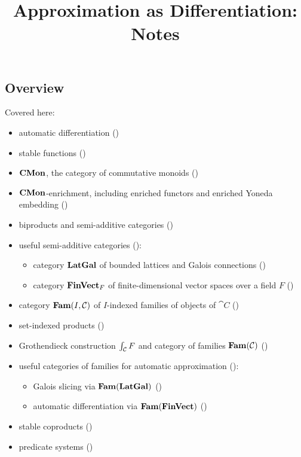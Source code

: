 \documentclass[acmsmall,screen]{acmart}
\begin{document}
\title{Approximation as Differentiation: Notes}

\maketitle

\subsection{Overview}

Covered here:
\begin{itemize}
\item automatic differentiation ()
\item stable functions ()
\item $\mathbf{CMon}$, the category of commutative monoids ()
\item $\mathbf{CMon}$-enrichment, including enriched functors and enriched Yoneda embedding ()
\item biproducts and semi-additive categories ()
\item useful semi-additive categories ():
   \begin{itemize}
   \item category $\mathbf{LatGal}$ of bounded lattices and Galois connections ()
   \item category $\mathbf{FinVect}_F$ of finite-dimensional vector spaces over a field $F$
   ()
   \end{itemize}
\item category $\mathbf{Fam}(I,\mathcal{C})$ of $I$-indexed families of objects of $\cat{C}$ ()
\item set-indexed products ()
\item Grothendieck construction $\int_{\mathcal{C}}F$ and category of families $\mathbf{Fam}(\mathcal{C})$
()
\item useful categories of families for automatic approximation
():
   \begin{itemize}
      \item Galois slicing via $\mathbf{Fam}(\mathbf{LatGal})$ ()
      \item automatic differentiation via $\mathbf{Fam}(\mathbf{FinVect})$ ()
   \end{itemize}
\item stable coproducts ()
\item predicate systems ()
\end{itemize}
\end{document}
